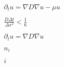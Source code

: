 \documentclass{article}
\begin{document}
$ \partial_t u = \nabla D \nabla u - \mu u $
\pagebreak

$ \frac{D \Delta t}{\Delta x^2} < \frac{1}{6} $
\pagebreak

$ \partial_t u = \nabla D \nabla u $
\pagebreak

$n_i$
\pagebreak

$i$
\pagebreak
\end{document}
